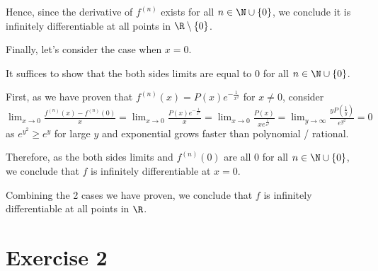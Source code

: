 \documentclass[11pt, cyan, night, 0.5in]{LatexTemplate/hw}
\begin{document}
{    Hence, since the derivative of $f^{(n)}$ exists for all $n\in\N\cup\{0\}$, we conclude it is infinitely differentiable at all points in $\R\setminus\{0\}$.

    Finally, let's consider the case when $x=0$.

    It suffices to show that the both sides limits are equal to 0 for all $n\in\N\cup\{0\}$.

    First, as we have proven that $f^{(n)}(x)=P(x)e^{-\frac{1}{x^2}}$ for $x\ne0$, consider $\lim_{x\to0}\frac{f^{(n)}(x) - f^{(n)}(0)}{x}=\lim_{x\to0}\frac{P(x)e^{-\frac{1}{x^2}}}{x}=\lim_{x\to0}\frac{P(x)}{xe^{\frac{1}{x^2}}}=\lim_{y\to\infty}\frac{yP(\frac{1}{y})}{e^{y^2}}=0$ as $e^{y^2}\ge e^y$ for large $y$ and exponential grows faster than polynomial / rational.

    Therefore, as the both sides limits and $f^{(n)}(0)$ are all 0 for all $n\in\N\cup\{0\}$, we conclude that $f$ is infinitely differentiable at $x=0$.

    Combining the 2 cases we have proven, we conclude that $f$ is infinitely differentiable at all points in $\R$.
}





\np
\section*{Exercise 2}

\end{document}
